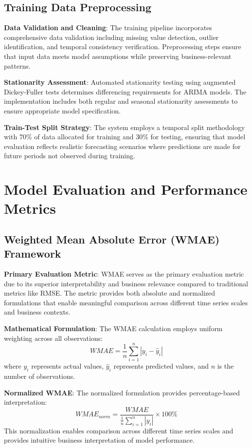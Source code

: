 \subsection{Training Data Preprocessing}

\textbf{Data Validation and Cleaning}: The training pipeline incorporates comprehensive data validation including missing value detection, outlier identification, and temporal consistency verification. Preprocessing steps ensure that input data meets model assumptions while preserving business-relevant patterns.

\textbf{Stationarity Assessment}: Automated stationarity testing using augmented Dickey-Fuller tests determines differencing requirements for ARIMA models. The implementation includes both regular and seasonal stationarity assessments to ensure appropriate model specification.

\textbf{Train-Test Split Strategy}: The system employs a temporal split methodology with 70\% of data allocated for training and 30\% for testing, ensuring that model evaluation reflects realistic forecasting scenarios where predictions are made for future periods not observed during training.

\section{Model Evaluation and Performance Metrics}

\subsection{Weighted Mean Absolute Error (WMAE) Framework}

\textbf{Primary Evaluation Metric}: WMAE serves as the primary evaluation metric due to its superior interpretability and business relevance compared to traditional metrics like RMSE. The metric provides both absolute and normalized formulations that enable meaningful comparison across different time series scales and business contexts.

\textbf{Mathematical Formulation}: The WMAE calculation employs uniform weighting across all observations:
\begin{equation}
WMAE = \frac{1}{n}\sum_{i=1}^{n} |y_i - \hat{y}_i|
\end{equation}
where $y_i$ represents actual values, $\hat{y}_i$ represents predicted values, and $n$ is the number of observations.

\textbf{Normalized WMAE}: The normalized formulation provides percentage-based interpretation:
\begin{equation}
WMAE_{norm} = \frac{WMAE}{\frac{1}{n}\sum_{i=1}^{n} |y_i|} \times 100\%
\end{equation}
This normalization enables comparison across different time series scales and provides intuitive business interpretation of model performance.

